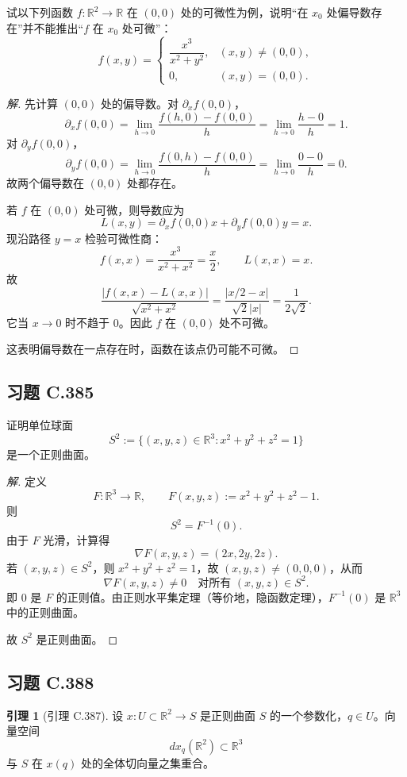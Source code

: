\documentclass[11pt,a4paper]{article}
\newcommand{\R}{\mathbb{R}}
\theoremstyle{definition}
\newtheorem{lemma}[theorem]{引理}
\newenvironment{solution}{\begin{proof}[解]}{\end{proof}}
\begin{document}
试以下列函数 $f : \R^2 \to \R$ 在 $(0,0)$ 处的可微性为例，说明“在 $x_0$ 处偏导数存在”并不能推出“$f$ 在 $x_0$ 处可微”：
\[
  f(x,y)=
  \begin{cases}
    \dfrac{x^3}{x^2+y^2}, & (x,y)\neq(0,0), \\
    0, & (x,y)=(0,0).
  \end{cases}
\]

\begin{solution}
先计算 $(0,0)$ 处的偏导数。对 $\partial_x f(0,0)$，
\[
  \partial_x f(0,0)
  = \lim_{h\to 0}\frac{f(h,0)-f(0,0)}{h}
  = \lim_{h\to 0}\frac{h-0}{h}=1.
\]
对 $\partial_y f(0,0)$，
\[
  \partial_y f(0,0)
  = \lim_{h\to 0}\frac{f(0,h)-f(0,0)}{h}
  = \lim_{h\to 0}\frac{0-0}{h}=0.
\]
故两个偏导数在 $(0,0)$ 处都存在。

若 $f$ 在 $(0,0)$ 处可微，则导数应为
\[
  L(x,y)=\partial_x f(0,0)x+\partial_y f(0,0)y=x.
\]
现沿路径 $y=x$ 检验可微性商：
\[
  f(x,x)=\frac{x^3}{x^2+x^2}=\frac{x}{2},
  \qquad
  L(x,x)=x.
\]
故
\[
  \frac{|f(x,x)-L(x,x)|}{\sqrt{x^2+x^2}}
  = \frac{|x/2-x|}{\sqrt{2}|x|}
  = \frac{1}{2\sqrt{2}}.
\]
它当 $x\to 0$ 时不趋于 $0$。因此 $f$ 在 $(0,0)$ 处不可微。

这表明偏导数在一点存在时，函数在该点仍可能不可微。
\end{solution}

\subsection{习题 C.385}

证明单位球面
\[
  S^2 := \{(x,y,z)\in\R^3 : x^2+y^2+z^2=1\}
\]
是一个正则曲面。

\begin{solution}
定义
\[
  F:\R^3\to\R, \qquad F(x,y,z):=x^2+y^2+z^2-1.
\]
则
\[
  S^2 = F^{-1}(0).
\]
由于 $F$ 光滑，计算得
\[
  \nabla F(x,y,z)=(2x,2y,2z).
\]
若 $(x,y,z)\in S^2$，则 $x^2+y^2+z^2=1$，故 $(x,y,z)\neq(0,0,0)$，从而
\[
  \nabla F(x,y,z)\neq 0 \quad \text{对所有 } (x,y,z)\in S^2.
\]
即 $0$ 是 $F$ 的正则值。由正则水平集定理（等价地，隐函数定理），$F^{-1}(0)$ 是 $\R^3$ 中的正则曲面。

故 $S^2$ 是正则曲面。
\end{solution}

\subsection{习题 C.388}

\begin{lemma}[引理 C.387]
  设 $x : U\subset\R^2 \to S$ 是正则曲面 $S$ 的一个参数化，$q\in U$。向量空间
  \[
    dx_q(\R^2)\subset\R^3
  \]
  与 $S$ 在 $x(q)$ 处的全体切向量之集重合。
\end{lemma}
\end{document}
